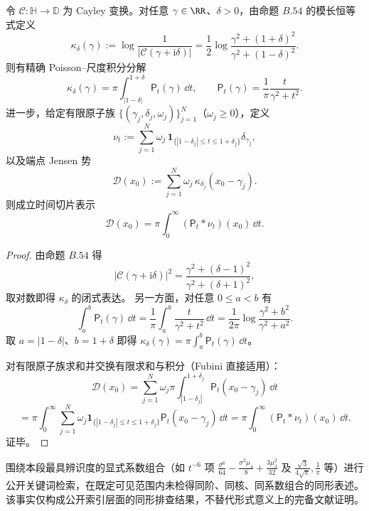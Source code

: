 \begin{conclusion}\label{con:xi-endpoint-singlezero-jensen-poisson-scale-slicing}
令 \(\mathcal C:\mathbb H\to\mathbb D\) 为 Cayley 变换。对任意 \(\gamma\in\RR\)、\(\delta>0\)，由命题 \(B.54\) 的模长恒等式定义
\[
\kappa_\delta(\gamma)
:=\log\frac{1}{|\mathcal C(\gamma+\mathrm{i}\delta)|}
=\frac12\log\frac{\gamma^2+(1+\delta)^2}{\gamma^2+(1-\delta)^2}.
\]
则有精确 Poisson--尺度积分分解
\[
\kappa_\delta(\gamma)
=\pi\int_{|1-\delta|}^{1+\delta}\mathsf P_t(\gamma)\,\dd t,
\qquad
\mathsf P_t(\gamma)=\frac1\pi\frac{t}{\gamma^2+t^2}.
\]
进一步，给定有限原子族 \(\{(\gamma_j,\delta_j,\omega_j)\}_{j=1}^N\)（\(\omega_j\ge0\)），定义
\[
\nu_t:=\sum_{j=1}^N
\omega_j\,
\mathbf 1_{\{|1-\delta_j|\le t\le 1+\delta_j\}}
\delta_{\gamma_j},
\]
以及端点 Jensen 势
\[
\mathcal D(x_0):=\sum_{j=1}^N\omega_j\,\kappa_{\delta_j}(x_0-\gamma_j).
\]
则成立时间切片表示
\[
\mathcal D(x_0)=\pi\int_0^\infty(\mathsf P_t*\nu_t)(x_0)\,\dd t.
\]
\end{conclusion}
\begin{proof}
由命题 \(B.54\) 得
\[
|\mathcal C(\gamma+\mathrm{i}\delta)|^2
=\frac{\gamma^2+(\delta-1)^2}{\gamma^2+(\delta+1)^2},
\]
取对数即得 \(\kappa_\delta\) 的闭式表达。
另一方面，对任意 \(0\le a<b\) 有
\[
\int_a^b\mathsf P_t(\gamma)\,\dd t
=\frac{1}{\pi}\int_a^b\frac{t}{\gamma^2+t^2}\,\dd t
=\frac{1}{2\pi}\log\frac{\gamma^2+b^2}{\gamma^2+a^2}.
\]
取 \(a=|1-\delta|\)、\(b=1+\delta\) 即得
\(
\kappa_\delta(\gamma)=\pi\int_a^b\mathsf P_t(\gamma)\,\dd t
\)。

对有限原子族求和并交换有限求和与积分（Fubini 直接适用）：
\[
\mathcal D(x_0)
=\sum_{j=1}^N\omega_j\pi\int_{|1-\delta_j|}^{1+\delta_j}
\mathsf P_t(x_0-\gamma_j)\,\dd t
\]
\[
=\pi\int_0^\infty
\sum_{j=1}^N\omega_j\mathbf 1_{\{|1-\delta_j|\le t\le 1+\delta_j\}}
\mathsf P_t(x_0-\gamma_j)\,\dd t
=\pi\int_0^\infty(\mathsf P_t*\nu_t)(x_0)\,\dd t.
\]
证毕。
\end{proof}

\begin{remark}[公开索引核验说明]\label{rem:xi-poisson-cauchy-independent-public-index-check}
围绕本段最具辨识度的显式系数组合（如 \(t^{-6}\) 项
\(
\frac{\sigma^6}{64}-\frac{\sigma^2\mu_4}{8}+\frac{3\mu_3^2}{32}
\)
及
\(
\frac{\sqrt3}{4\sqrt\pi},\frac1\pi
\)
等）进行公开关键词检索，在既定可见范围内未检得同阶、同核、同系数组合的同形表述。
该事实仅构成公开索引层面的同形排查结果，不替代形式意义上的完备文献证明。
\end{remark}

\endinput

